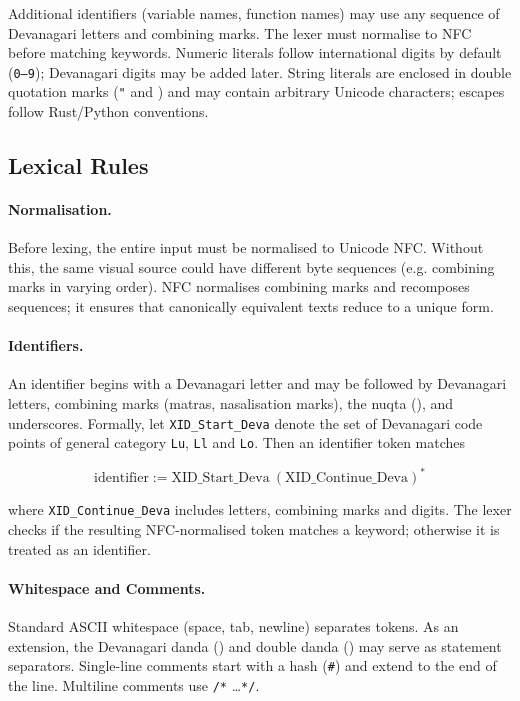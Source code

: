 \documentclass[12pt]{article}
\begin{document}
Additional identifiers (variable names, function names) may use any
sequence of Devanagari letters and combining marks.  The lexer must
normalise to NFC before matching keywords.  Numeric literals follow
international digits by default (\texttt{0–9}); Devanagari digits may be
added later.  String literals are enclosed in double quotation marks
(\texttt{"} and ) and may contain arbitrary Unicode
characters; escapes follow Rust/Python conventions.

\subsection{Lexical Rules}

\paragraph{Normalisation.} Before lexing, the entire input must be
normalised to Unicode NFC.  Without this, the same visual source could have
different byte sequences (e.g. combining marks in varying order).  NFC
normalises combining marks and recomposes sequences; it ensures that
canonically equivalent texts reduce to a unique form.

\paragraph{Identifiers.} An identifier begins with a Devanagari letter and may
be followed by Devanagari letters, combining marks (matras, nasalisation
marks), the nuqta (), and underscores.  Formally, let
\texttt{XID\_Start\_Deva} denote the set of Devanagari code points of
general category \texttt{Lu}, \texttt{Ll} and \texttt{Lo}.  Then an
identifier token matches

\[\text{identifier} := \mathrm{XID\_Start\_Deva}\ (\mathrm{XID\_Continue\_Deva})^*\]

where \texttt{XID\_Continue\_Deva} includes letters, combining marks and
digits.  The lexer checks if the resulting NFC-normalised token matches a
keyword; otherwise it is treated as an identifier.

\paragraph{Whitespace and Comments.} Standard ASCII whitespace (space, tab,
newline) separates tokens.  As an extension, the Devanagari danda
() and double danda () may serve as
statement separators.  Single-line comments start with a hash (\texttt{\#})
and extend to the end of the line.  Multiline comments use
\texttt{/*} \dots \texttt{*/}.
\end{document}
